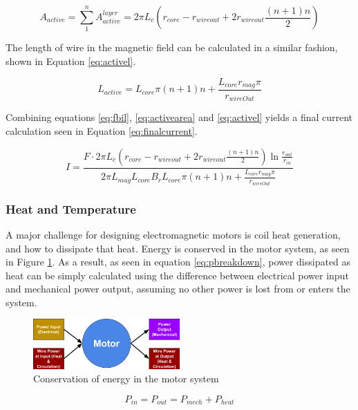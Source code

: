 \documentclass[a4paper,12pt]{article}
\begin{document}
\begin{equation}\label{eq:activearea}
    A_{active} = \sum_{1}^{n}{A_{active}^{layer}} = 2\pi L_c (r_{core}-r_{wireout} + 2r_{wireout} \frac{(n+1)n}{2})
\end{equation}

The length of wire in the magnetic field can be calculated in a similar fashion, shown in Equation \ref{eq:activel}.

\begin{equation}\label{eq:activel}
    L_{active} = L_{core}\pi(n+1)n + \frac{L_{core} r_{mag} \pi}{r_{wireOut}}
\end{equation}

Combining equations \ref{eq:fbil}, \ref{eq:activearea} and \ref{eq:activel} yields a final current calculation seen in Equation \ref{eq:finalcurrent}.

\begin{equation}\label{eq:finalcurrent}
    I = \frac{F\cdot 2\pi L_c (r_{core}-r_{wireout} + 2r_{wireout} \frac{(n+1)n}{2}) \ln{\frac{r_{out}}{r_{in}}}}{2\pi L_{mag} L_{core} B_r L_{core}\pi(n+1)n + \frac{L_{core} r_{mag} \pi}{r_{wireOut}}}
\end{equation}

\subsubsection{Heat and Temperature}

A major challenge for designing electromagnetic motors is coil heat generation, and how to dissipate that heat. Energy is conserved in the motor system, as seen in Figure \ref{fg:motorheat}. As a result, as seen in equation \ref{eq:pbreakdown}, power dissipated as heat can be simply calculated using the difference between electrical power input and mechanical power output, assuming no other power is lost from or enters the system.

\begin{figure}[h!]
    \centering
    \includegraphics[width=0.5\textwidth]{motorheat.png}
    \caption{Conservation of energy in the motor system}
    \label{fg:motorheat}
    \end{figure}

\begin{equation}\label{eq:pbreakdown}
    P_{in}=P_{out}=P_{mech}+P_{heat}
\end{equation}
\end{document}

